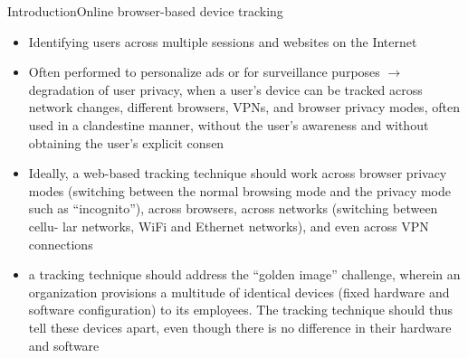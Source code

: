 \documentclass[a4paper]{article}
\begin{document}
\begin{frame}[fragile]{Introduction}{Online browser-based device tracking}
	\begin{itemize}
		\item Identifying users across multiple sessions and websites on the Internet
		\item Often performed to personalize ads or for surveillance purposes $\rightarrow$ degradation of user privacy, when a user’s device can be tracked across network changes, different browsers, VPNs, and browser privacy modes, often used in a clandestine manner, without the user’s awareness and without obtaining the user’s explicit consen
		\item Ideally, a web-based tracking technique should work across browser privacy modes (switching between the normal browsing mode and the privacy mode such as “incognito”), across browsers, across networks (switching between cellu- lar networks, WiFi and Ethernet networks), and even across VPN connections
		\item a tracking technique should address the \enquote{golden image} challenge, wherein an organization provisions a multitude of identical devices (fixed hardware and software configuration) to its employees. The tracking technique should thus tell these devices apart, even though there is no difference in their hardware and software

\end{itemize}
\end{frame}
\end{document}
